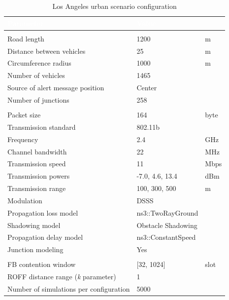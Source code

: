 				\begin{table}[H]
			\def\arraystretch{1.1}
			\begin{tabularx}{\textwidth}{l | l  l}
				\rowcolor{I} {\large \textcolor{white}{Parameter}} & {\large \textcolor{white}{Value}} & {\large \textcolor{white}{}} \TBstrut  \\
				\toprule
				\endhead
				\rowcolor{P} \multicolumn{3}{c}{Scenario configuration} \\
				\midrule[1pt]
				Road length 							& 1200	 				& m		\\
				Distance between vehicles 				& 25					& m		\\
				Circumference radius					& 1000					& m		\\
				Number of vehicles						& 1465					& 		\\
				Source of alert message position		& Center				&		\\
				Number of junctions						& 258					&		\\	
				\midrule[1pt]
				\rowcolor{P} \multicolumn{3}{c}{Network configuration} \\
				\midrule[1pt]
				Packet size								& 164					& byte	\\	
				Transmission standard					& 802.11b				&		\\
				Frequency								& 2.4					& GHz	\\
				Channel bandwidth						& 22					& MHz	\\
				Transmission speed						& 11					& Mbps	\\
				Transmission powers						& -7.0, 4.6, 13.4		& dBm	\\
				Transmission range						& 100, 300, 500			& m		\\
				Modulation								& DSSS					& 		\\
				Propagation loss model					& ns3::TwoRayGround 	&		\\
				Shadowing model							& Obstacle Shadowing 	&		\\
				Propagation delay model					& ns3::ConstantSpeed	&		\\
				Junction modeling						& Yes					&		\\
				\midrule[1pt]
				\rowcolor{P} \multicolumn{3}{c}{Protocols configuration} \\
				\midrule[1pt]
				FB contention window					& [32, 1024]			& slot	\\
				ROFF distance range (\textit{k} parameter) & 1					&		\\	
				\midrule[1pt]
				Number of simulations per configuration	& 5000					&		\\
				\bottomrule
			\end{tabularx}
			\caption{Los Angeles urban scenario configuration}
			\label{tab:la-25}
		\end{table}
	
